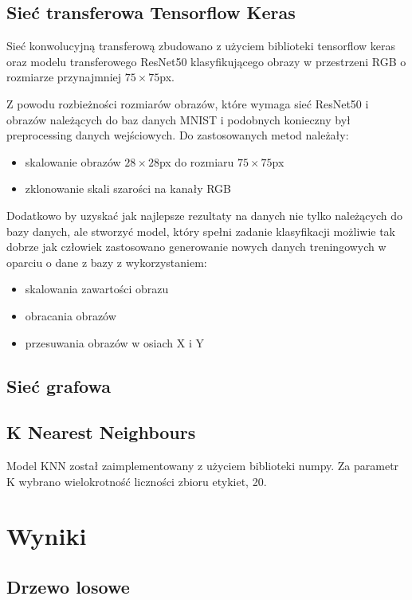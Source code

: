 \documentclass{article}
\begin{document}
\subsection{Sieć transferowa Tensorflow Keras}

Sieć konwolucyjną transferową zbudowano z użyciem biblioteki tensorflow 
keras oraz modelu transferowego ResNet50 klasyfikującego obrazy w 
przestrzeni RGB o rozmiarze przynajmniej $75\times75$px.

Z powodu rozbieżności rozmiarów obrazów, które wymaga sieć ResNet50 
i obrazów należących do baz danych MNIST i podobnych konieczny był 
preprocessing danych wejściowych. Do zastosowanych metod należały:

\begin{itemize}
\item skalowanie obrazów $28\times28$px do rozmiaru $75\times75$px
\item zklonowanie skali szarości na kanały RGB 
\end{itemize}

Dodatkowo by uzyskać jak najlepsze rezultaty na danych nie tylko 
należących do bazy danych, ale stworzyć model, który spełni zadanie 
klasyfikacji możliwie tak dobrze jak człowiek zastosowano 
generowanie nowych danych treningowych w oparciu o dane z bazy z wykorzystaniem:

\begin{itemize}
\item skalowania zawartości obrazu
\item obracania obrazów
\item przesuwania obrazów w osiach X i Y
\end{itemize}


\subsection{Sieć grafowa}
\subsection{K Nearest Neighbours}
Model KNN został zaimplementowany z użyciem biblioteki numpy. Za parametr K 
wybrano wielokrotność liczności zbioru etykiet, 20.



\section{Wyniki}
\subsection{Drzewo losowe}
\end{document}
